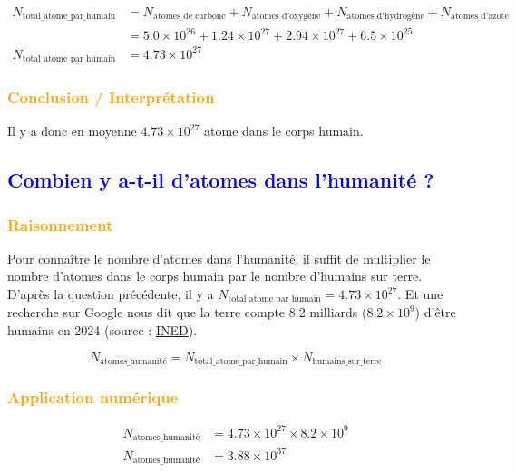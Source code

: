 \documentclass[a4paper,12pt]{article}
\begin{document}
\begin{align*}
N_{\text{total\_atome\_par\_humain}} &= N_{\text{atomes de carbone}} + N_{\text{atomes d'oxygène}} + N_{\text{atomes d'hydrogène}} + N_{\text{atomes d'azote}} \\
& = 5.0 \times 10^{26} + 1.24 \times 10^{27} + 2.94 \times 10^{27} + 6.5 \times 10^{25} \\
N_{\text{total\_atome\_par\_humain}} &= 4.73 \times 10^{27}
\end{align*}

\subsubsection*{\textcolor{orange}{Conclusion / Interprétation}}

Il y a donc en moyenne $4.73 \times 10^{27}$ atome dans le corps humain.

\subsection{\textcolor{blue}{Combien y a-t-il d'atomes dans l'humanité ?}}

\subsubsection*{\textcolor{orange}{Raisonnement}}

Pour connaître le nombre d'atomes dans l'humanité, il suffit de multiplier le nombre d'atomes dans le corps humain par le nombre d'humains sur terre.
D'après la question précédente, il y a $N_{\text{total\_atome\_par\_humain}} = 4.73 \times 10^{27}$. 
Et une recherche sur Google nous dit que la terre compte 8.2 milliards ($8.2 \times 10^9$) d'être humains en 2024 (source : \href{https://www.ined.fr/fr/tout-savoir-population/memos-demo/focus/2024-les-nations-unies-publient-de-nouvelles-projections-de-population-mondiale/#:~:text=La%20plan%C3%A8te%20compte%208%2C2,autres%20voient%20leur%20population%20diminuer.}{INED}).

\[
N_{\text{atomes\_humanité}} = N_{\text{total\_atome\_par\_humain}} \times N_{\text{humains\_sur\_terre}}
\]

\subsubsection*{\textcolor{orange}{Application numérique}}

\begin{align*}
  N_{\text{atomes\_humanité}} &= 4.73 \times 10^{27} \times 8.2 \times 10^9 \\
  N_{\text{atomes\_humanité}} &= 3.88 \times 10^{37}
\end{align*}
\end{document}
